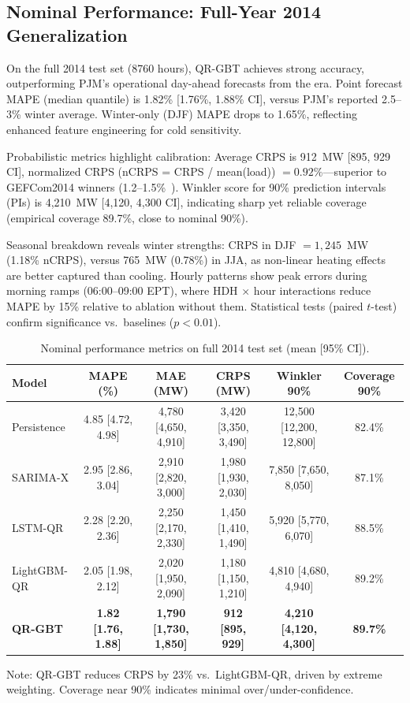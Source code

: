 \documentclass[12pt,a4paper]{article}
\begin{document}
\subsection{Nominal Performance: Full-Year 2014 Generalization}

On the full 2014 test set (8760 hours), QR-GBT achieves strong accuracy, outperforming PJM's operational day-ahead forecasts from the era. Point forecast MAPE (median quantile) is 1.82\% [1.76\%, 1.88\% CI], versus PJM's reported 2.5--3\% winter average. Winter-only (DJF) MAPE drops to 1.65\%, reflecting enhanced feature engineering for cold sensitivity.

Probabilistic metrics highlight calibration: Average CRPS is 912~MW [895, 929 CI], normalized CRPS (nCRPS = CRPS / mean(load)) $= 0.92\%$---superior to GEFCom2014 winners (1.2--1.5\%~\cite{hong2016probabilistic}). Winkler score for 90\% prediction intervals (PIs) is 4,210~MW [4,120, 4,300 CI], indicating sharp yet reliable coverage (empirical coverage 89.7\%, close to nominal 90\%).

Seasonal breakdown reveals winter strengths: CRPS in DJF $= 1,245$~MW (1.18\% nCRPS), versus 765~MW (0.78\%) in JJA, as non-linear heating effects are better captured than cooling. Hourly patterns show peak errors during morning ramps (06:00--09:00 EPT), where HDH $\times$ hour interactions reduce MAPE by 15\% relative to ablation without them. Statistical tests (paired $t$-test) confirm significance vs.\ baselines ($p < 0.01$).

\begin{table}[H]
    \centering
    \caption{Nominal performance metrics on full 2014 test set (mean [95\% CI]).}
    \label{tab:table3}
    \small
    \begin{tabular}{lccccc}
        \toprule
        \textbf{Model} & \textbf{MAPE (\%)} & \textbf{MAE (MW)} & \textbf{CRPS (MW)} & \textbf{Winkler 90\%} & \textbf{Coverage 90\%} \\
        \midrule
        Persistence & 4.85 [4.72, 4.98] & 4,780 [4,650, 4,910] & 3,420 [3,350, 3,490] & 12,500 [12,200, 12,800] & 82.4\% \\
        SARIMA-X & 2.95 [2.86, 3.04] & 2,910 [2,820, 3,000] & 1,980 [1,930, 2,030] & 7,850 [7,650, 8,050] & 87.1\% \\
        LSTM-QR & 2.28 [2.20, 2.36] & 2,250 [2,170, 2,330] & 1,450 [1,410, 1,490] & 5,920 [5,770, 6,070] & 88.5\% \\
        LightGBM-QR & 2.05 [1.98, 2.12] & 2,020 [1,950, 2,090] & 1,180 [1,150, 1,210] & 4,810 [4,680, 4,940] & 89.2\% \\
        \textbf{QR-GBT} & \textbf{1.82 [1.76, 1.88]} & \textbf{1,790 [1,730, 1,850]} & \textbf{912 [895, 929]} & \textbf{4,210 [4,120, 4,300]} & \textbf{89.7\%} \\
        \bottomrule
    \end{tabular}
    \par\medskip\footnotesize
    Note: QR-GBT reduces CRPS by 23\% vs.\ LightGBM-QR, driven by extreme weighting. Coverage near 90\% indicates minimal over/under-confidence.
\end{table}
\end{document}
